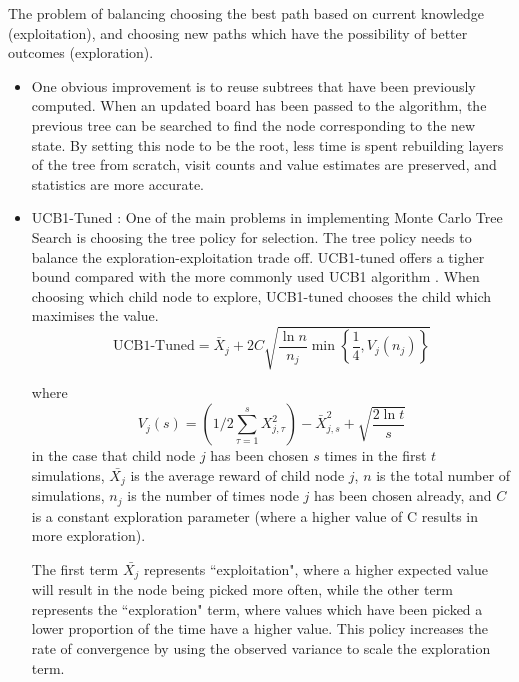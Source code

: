 \begin{definition}
    The problem of balancing choosing the best path based on current knowledge (exploitation), and choosing new paths which have the possibility of better outcomes (exploration).
    
\end{definition}

\begin{itemize}
    \item One obvious improvement is to reuse subtrees that have been previously computed. When an updated board has been passed to the algorithm, the previous tree can be searched to find the node corresponding to the new state. By setting this node to be the root, less time is spent rebuilding layers of the tree from scratch, visit counts and value estimates are preserved, and statistics are more accurate.  
    
    \item UCB1-Tuned \cite{monteCarloImprovements} \cite{banditproblem}: One of the main problems in implementing Monte Carlo Tree Search is choosing the tree policy for selection. The tree policy needs to balance the exploration-exploitation trade off. UCB1-tuned offers a tigher bound compared with the more commonly used UCB1 algorithm \cite{ucb1tuned}. When choosing which child node to explore, UCB1-tuned chooses the child which maximises the value.
    \begin{equation}
        \mathrm{UCB} 1 \text{-Tuned}=\bar{X}_j+2C\sqrt{\frac{\ln n}{n_j} \min \left\{\frac{1}{4}, V_j\left(n_j\right)\right\}}
        \label{eq:ucb1}
    \end{equation}
    
    
    where 
    $$
    V_j(s)=\left(1 / 2 \sum_{\tau=1}^s X_{j, \tau}^2\right)-\bar{X}_{j, s}^2+\sqrt{\frac{2 \ln t}{s}}
    $$ in the case that child node $j$ has been chosen $s$ times in the first $t$ simulations, $\bar{X_j}$ is the average reward of child node $j$, $n$ is the total number of simulations, $n_j$ is the number of times node $j$ has been chosen already, and $C$ is a constant exploration parameter (where a higher value of C results in more exploration). 
    
    The first term $\bar{X_j}$ represents ``exploitation", where a higher expected value will result in the node being picked more often, while the other term represents the ``exploration" term, where values which have been picked a lower proportion of the time have a higher value.
    This policy increases the rate of convergence by using the observed variance to scale the exploration term.


\end{itemize}
